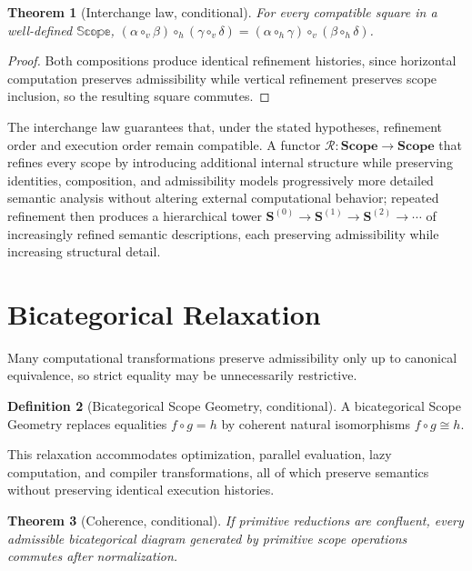 \documentclass[11pt,twoside,openright]{book}
\numberwithin{equation}{chapter}
\theoremstyle{definition}
\newtheorem{definition}{Definition}[chapter]
\theoremstyle{plain}
\newtheorem{theorem}[definition]{Theorem}
\theoremstyle{remark}
\theoremstyle{definition}
\newcommand{\CatScope}{\mathbf{Scope}}
\newcommand{\Scope}{\mathbf{S}}
\begin{document}
\begin{theorem}[Interchange law, conditional]
For every compatible square in a well-defined $\mathbb{Scope}$,
$(\alpha\circ_v\beta)\circ_h(\gamma\circ_v\delta)=(\alpha\circ_h\gamma)\circ_v(\beta\circ_h\delta)$.
\end{theorem}

\begin{proof}
Both compositions produce identical refinement histories, since
horizontal computation preserves admissibility while vertical refinement
preserves scope inclusion, so the resulting square commutes.
\end{proof}

The interchange law guarantees that, under the stated hypotheses,
refinement order and execution order remain compatible. A functor
$\mathcal{R}:\CatScope\to\CatScope$ that refines every scope by
introducing additional internal structure while preserving identities,
composition, and admissibility models progressively more detailed
semantic analysis without altering external computational behavior;
repeated refinement then produces a hierarchical tower
$\Scope^{(0)}\to\Scope^{(1)}\to\Scope^{(2)}\to\cdots$ of increasingly
refined semantic descriptions, each preserving admissibility while
increasing structural detail.

\section{Bicategorical Relaxation}

Many computational transformations preserve admissibility only up to
canonical equivalence, so strict equality may be unnecessarily
restrictive.

\begin{definition}[Bicategorical Scope Geometry, conditional]
A bicategorical Scope Geometry replaces equalities $f\circ g=h$ by
coherent natural isomorphisms $f\circ g\cong h$.
\end{definition}

This relaxation accommodates optimization, parallel evaluation, lazy
computation, and compiler transformations, all of which preserve
semantics without preserving identical execution histories.

\begin{theorem}[Coherence, conditional]
If primitive reductions are confluent, every admissible bicategorical
diagram generated by primitive scope operations commutes after
normalization.
\end{theorem}
\end{document}
